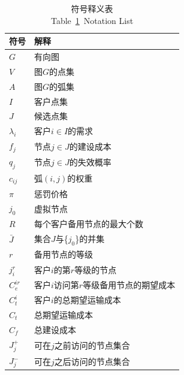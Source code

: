 \begin{table}[!htb]\normalsize   %
\setlength{\abovecaptionskip}{-0.05cm} %
\setlength{\belowcaptionskip}{-0.2cm} 
  \centering
  \renewcommand\arraystretch{1}
  \caption{符号释义表\\Table~\ref{table:符号}~Notation List}
\begin{tabular}{p{1.5cm}<{\centering} l}
  \toprule
  \textbf{符号} & \textbf{解释} \\
  \midrule %
    $G$   &  有向图      \\
    $V$   &  图$G$的点集      \\
    $A$   &  图$G$的弧集      \\
    $I$   &  客户点集 \\
    $J$   &  候选点集 \\
    $\lambda_i$ & 客户$i\in I$的需求 \\ 
    $f_j$   &  节点$j\in J$的建设成本 \\
    $q_j$   &  节点$j\in J$的失效概率 \\
    $c_{ij}$ & 弧$(i,j)$的权重 \\
    $\pi$ & 惩罚价格 \\
    $j_0$ & 虚拟节点 \\
    $R$ & 每个客户备用节点的最大个数 \\
    $\bar{J}$ & 集合$J$与\{$j_0$\}的并集 \\
    $r$ & 备用节点的等级 \\
    $j_i^r$ & 客户$i$的第$r$等级的节点 \\
    $C_e^{ir}$ & 客户$i$访问第$r$等级备用节点的期望成本 \\
    $C_t^i$ & 客户$i$的总期望运输成本 \\
    $C_t$   & 总期望运输成本 \\
    $C_f$   & 总建设成本 \\
    $J_j^+$ & 可在$j$之前访问的节点集合\\
    $J_j^-$ & 可在$j$之后访问的节点集合\\
  \bottomrule
  \end{tabular}
  \label{table:符号}
\end{table}

